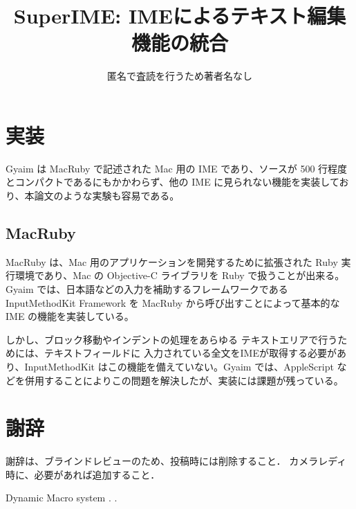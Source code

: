 \documentclass[twoside]{wiss}
\def\system{SuperIME}
\def\papertitle{\system: IMEによるテキスト編集機能の統合}
\begin{document}
\title{\papertitle}
\etitle{}%
%
%
%
\author{匿名で査読を行うため著者名なし
	}



\maketitle





\section{実装}
Gyaim は MacRuby で記述された Mac 用の IME であり、ソースが 500 行程度とコンパクトであるにもかかわらず、他の IME に見られない機能を実装しており、本論文のような実験も容易である。

\subsection{MacRuby}
MacRuby は、Mac 用のアプリケーションを開発するために拡張された Ruby 実行環境であり、Mac の Objective-C ライブラリを Ruby で扱うことが出来る。
Gyaim では、日本語などの入力を補助するフレームワークである InputMethodKit Framework を MacRuby から呼び出すことによって基本的な IME の機能を実装している。

しかし、ブロック移動やインデントの処理をあらゆる テキストエリアで行うためには、テキストフィールドに 入力されている全文をIMEが取得する必要があり、InputMethodKit はこの機能を備えていない。Gyaim では、AppleScript などを併用することによりこの問題を解決したが、実装には課題が残っている。


\section*{謝辞}

謝辞は、ブラインドレビューのため、投稿時には削除すること．
カメラレディ時に、必要があれば追加すること．

Dynamic Macro system\cite{DynamicMacro}
\cite{texteditors.org}
\cite{Kawada:WP}
\cite{Mori:WordProcessor}
\cite{Doi:STARS}
\cite{Doi:COLING98}
\cite{texteditors.org}
\cite{Li:1lineKB}\cite{MacKenzie:H4Writer}\cite{Rick:VirtualKB}
\cite{Dietz:PressureKB}\cite{Harrison:Skinput}\cite{Murase:CameraKB}\cite{Wigdor:TiltKB}
\cite{Tesler:CopyPaste}.
\cite{Masui:Goldfish}\cite{PickAndDrop}.
\end{document}
